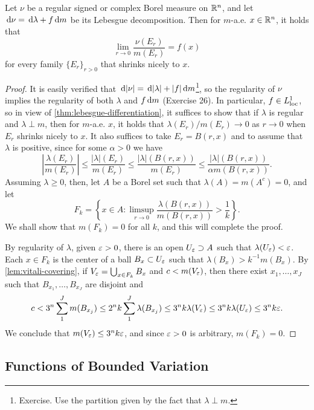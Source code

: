 \documentclass[12pt]{article} %
\begin{document}
\begin{theorem}\label{thm:3.22}
    Let $\nu$ be a regular signed or complex Borel measure on $\mathbb{R}^n$, and let $\, \mathrm{d} \nu = \, \mathrm{d} \lambda + f \, \mathrm{d} m$ be its Lebesgue decomposition. Then for $m$-a.e. $x \in \mathbb{R}^n$, it holds that \[\lim_{r \to 0} \frac{\nu(E_r)}{m(E_r)} = f(x)\] for every family $\{E_r\}_{r > 0}$ that shrinks nicely to $x$.
\end{theorem}

\begin{proof}
    It is easily verified that $\, \mathrm{d} |\nu| = \, \mathrm{d} |\lambda| + |f|\, \mathrm{d} m$\footnote{Exercise. Use the partition given by the fact that $\lambda \perp m$.}, so the regularity of $\nu$ implies the regularity of both $\lambda$ and $f \, \mathrm{d} m$ (Exercise 26). In particular, $f \in L_{\operatorname{loc}}^1$, so in view of \cref{thm:lebesgue-differentiation}, it suffices to show that if $\lambda$ is regular and $\lambda \perp m$, then for $m$-a.e. $x$, it holds that $\lambda(E_r) / m(E_r) \to 0$ as $r \to 0$ when $E_r$ shrinks nicely to $x$. It also suffices to take $E_r = B(r, x)$ and to assume that $\lambda$ is positive, since for some $\alpha > 0$ we have \[\left|\frac{\lambda(E_r)}{m(E_r)}\right| \leq \frac{|\lambda|(E_r)}{m(E_r)} \leq \frac{|\lambda|(B(r, x))}{m(E_r)} \leq \frac{|\lambda|(B(r, x))}{\alpha m(B(r, x))}.\] Assuming $\lambda \geq 0$, then, let $A$ be a Borel set such that $\lambda(A) = m(A^c) = 0$, and let \[F_k = \left\{ x \in A : \limsup_{r \to 0} \frac{\lambda(B(r, x))}{m(B(r, x))} > \frac{1}{k} \right\}.\] We shall show that $m(F_k) = 0$ for all $k$, and this will complete the proof.

    By regularity of $\lambda$, given $\varepsilon > 0$, there is an open $U_\varepsilon \supset A$ such that $\lambda(U_\varepsilon) < \varepsilon$. Each $x \in F_k$ is the center of a ball $B_x \subset U_\varepsilon$ such that $\lambda(B_x) > k^{-1}m(B_x)$. By \cref{lem:vitali-covering}, if $V_\varepsilon = \bigcup_{x \in F_k} B_x$ and $c < m(V_\varepsilon)$, then there exist $x_1, \ldots, x_J$ such that $B_{x_1}, \ldots, B_{x_J}$ are disjoint and \[c < 3^n \sum_1^J m(B_{x_j}) \leq 2^n k \sum_1^J \lambda(B_{x_j}) \leq 3^n k \lambda(V_\varepsilon) \leq 3^n k \lambda(U_\varepsilon) \leq 3^n k \varepsilon.\] We conclude that $m(V_\varepsilon) \leq 3^n k \varepsilon$, and since $\varepsilon > 0$ is arbitrary, $m(F_k) = 0$.
\end{proof}

\subsection{Functions of Bounded Variation}
\end{document}
